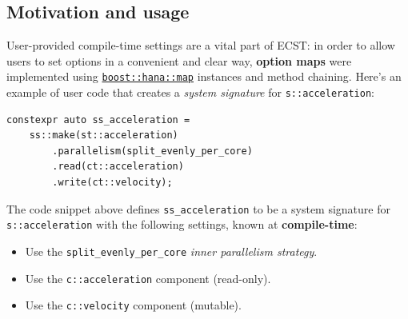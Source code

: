 \documentclass[twoside, 12pt, a4paper, openany]{book}
\begin{document}
\subsection{Motivation and usage}\label{motivation-and-usage-1}

User-provided compile-time settings are a vital part of ECST: in order
to allow users to set options in a convenient and clear way,
\textbf{option maps} were implemented using
\href{http://www.boost.org/doc/libs/1_61_0/libs/hana/doc/html/structboost_1_1hana_1_1map.html}{\texttt{boost::hana::map}}
instances and method chaining. Here's an example of user code that
creates a \emph{system signature} for
\texttt{s::acceleration}:

\begin{verbatim}
constexpr auto ss_acceleration =
    ss::make(st::acceleration)
        .parallelism(split_evenly_per_core)
        .read(ct::acceleration)
        .write(ct::velocity);
\end{verbatim}

The code snippet above defines
\texttt{ss_acceleration}
to be a system signature for
\texttt{s::acceleration}
with the following settings, known at \textbf{compile-time}:

\begin{itemize}
\item
  Use the
  \texttt{split_evenly_per_core}
  \emph{inner parallelism strategy}.
\item
  Use the
  \texttt{c::acceleration}
  component (read-only).
\item
  Use the
  \texttt{c::velocity}
  component (mutable).
\end{itemize}
\end{document}
